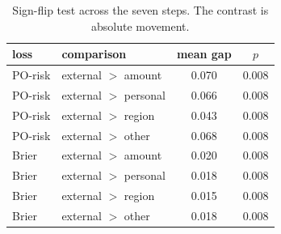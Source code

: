 \begin{table}[t]
\centering
\caption{Sign-flip test across the seven steps. The contrast is absolute movement.}
\label{tab:home-credit-sign}
\begin{tabular}{llcc}
\toprule
loss & comparison & mean gap & $p$ \\
\midrule
PO-risk & external $>$ amount & 0.070 & 0.008 \\
PO-risk & external $>$ personal & 0.066 & 0.008 \\
PO-risk & external $>$ region & 0.043 & 0.008 \\
PO-risk & external $>$ other & 0.068 & 0.008 \\
Brier & external $>$ amount & 0.020 & 0.008 \\
Brier & external $>$ personal & 0.018 & 0.008 \\
Brier & external $>$ region & 0.015 & 0.008 \\
Brier & external $>$ other & 0.018 & 0.008 \\
\bottomrule
\end{tabular}
\end{table}

